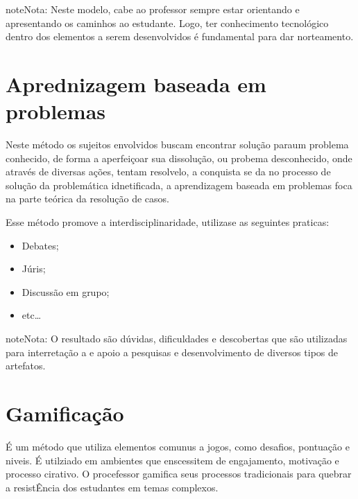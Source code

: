 \documentclass[letterpaper,10pt,brazil]{sphinxmanual}
\begin{document}
\begin{sphinxadmonition}{note}{Nota:}
Neste modelo, cabe ao professor sempre estar orientando e apresentando os caminhos ao estudante. Logo, ter conhecimento tecnológico dentro dos elementos a serem desenvolvidos é fundamental para dar norteamento.
\end{sphinxadmonition}


\section{Aprednizagem baseada em problemas}
\label{\detokenize{metodologias:aprednizagem-baseada-em-problemas}}
Neste método os sujeitos envolvidos buscam encontrar solução paraum problema conhecido, de forma a aperfeiçoar sua dissolução, ou probema desconhecido, onde através de diversas ações, tentam resolve\sphinxhyphen{}lo, a conquista se da no processo de solução da problemática idnetificada, a aprendizagem baseada em problemas foca na parte teórica da resolução de casos.

Esse método promove a interdisciplinaridade, utiliza\sphinxhyphen{}se as seguintes praticas:
\begin{itemize}
\item {} 
Debates;

\item {} 
Júris;

\item {} 
Discussão em grupo;

\item {} 
etc…

\end{itemize}

\begin{sphinxadmonition}{note}{Nota:}
O resultado são dúvidas, dificuldades e descobertas que são utilizadas para interretação a e apoio a pesquisas e desenvolvimento de diversos tipos de artefatos.
\end{sphinxadmonition}


\section{Gamificação}
\label{\detokenize{metodologias:gamificacao}}
É um método que utiliza elementos comunus a jogos, como desafios, pontuação e niveis. É utilziado em ambientes que enscessitem de engajamento, motivação e processo cirativo. O procefessor gamifica seus processos tradicionais para quebrar a resistÊncia dos estudantes em temas complexos.
\end{document}
